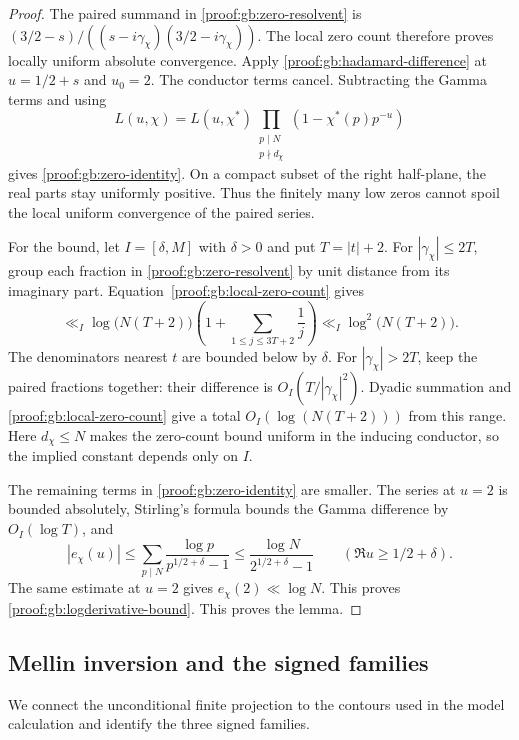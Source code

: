 \documentclass[12pt,a4paper]{amsart}
\numberwithin{equation}{section}
\def\le{\leqslant}
\def\ge{\geqslant}
\theoremstyle{plain}
\theoremstyle{definition}
\theoremstyle{remark}
\begin{document}
\begin{proof}
The paired summand in \eqref{proof:gb:zero-resolvent} is
$(3/2-s)/((s-i\gamma_\chi)(3/2-i\gamma_\chi))$.
The local zero count therefore proves locally uniform absolute
convergence. Apply \eqref{proof:gb:hadamard-difference} at
$u=1/2+s$ and $u_0=2$. The conductor terms cancel.
Subtracting the Gamma terms and using
\[
 L(u,\chi)=L(u,\chi^*)
       \prod_{\substack{p\mid N\\p\nmid d_\chi}}
                           (1-\chi^*(p)p^{-u})
\]
gives \eqref{proof:gb:zero-identity}.
On a compact subset of the right half-plane, the real parts stay
uniformly positive. Thus the finitely many low zeros cannot spoil
the local uniform convergence of the paired series.

For the bound, let $I=[\delta,M]$ with $\delta>0$ and put
$T=|t|+2$. For $|\gamma_\chi|\le2T$, group each fraction in
\eqref{proof:gb:zero-resolvent} by unit distance from its imaginary
part. Equation~\eqref{proof:gb:local-zero-count} gives
\[
 \ll_I\log\bigl(N(T+2)\bigr)
       \left(1+\sum_{1\le j\le3T+2}\frac1j\right)
 \ll_I\log^2\bigl(N(T+2)\bigr).
\]
The denominators nearest $t$ are bounded below by $\delta$.
For $|\gamma_\chi|>2T$, keep the paired fractions together:
their difference is $O_I(T/|\gamma_\chi|^2)$.
Dyadic summation and \eqref{proof:gb:local-zero-count} give a total
$O_I(\log(N(T+2)))$ from this range.
Here $d_\chi\le N$ makes the zero-count bound uniform in the
inducing conductor, so the implied constant depends only on $I$.

The remaining terms in \eqref{proof:gb:zero-identity} are smaller.
The series at $u=2$ is bounded absolutely, Stirling's formula bounds
the Gamma difference by $O_I(\log T)$, and
\[
 |e_\chi(u)|\le\sum_{p\mid N}\frac{\log p}{p^{1/2+\delta}-1}
       \le\frac{\log N}{2^{1/2+\delta}-1}
       \qquad(\Re u\ge1/2+\delta).
\]
The same estimate at $u=2$ gives $e_\chi(2)\ll\log N$.
This proves \eqref{proof:gb:logderivative-bound}.
This proves the lemma.
\end{proof}

\subsection{Mellin inversion and the signed families}
\label{proof:dir:character-mellin-summary}

We connect the unconditional finite projection to the contours used
in the model calculation and identify the three signed families.
\end{document}
